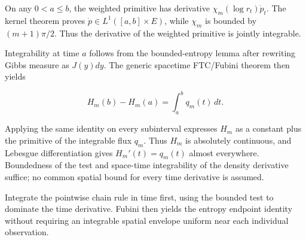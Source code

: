 \documentclass[11pt,a4paper]{report}
\begin{document}
On any \(0<a\le b\), the weighted primitive has derivative \(\chi_m(\log r_t)\dot p_t\). The kernel theorem proves \(\dot p\in L^1([a,b]\times E)\), while \(\chi_m\) is bounded by \((m+1)\pi/2\). Thus the derivative of the weighted primitive is jointly integrable.



Integrability at time \(a\) follows from the bounded-entropy lemma after rewriting Gibbs measure as \(J(y)dy\). The generic spacetime FTC/\allowbreak{}Fubini theorem then yields

\[H_m(b)-H_m(a)=\int_a^b q_m(t)\,dt.\]

Applying the same identity on every subinterval expresses \(H_m\) as a constant plus the primitive of the integrable flux \(q_m\). Thus \(H_m\) is absolutely continuous, and Lebesgue differentiation gives \(H_m'(t)=q_m(t)\) almost everywhere. Boundedness of the test and space-time integrability of the density derivative suffice; no common spatial bound for every time derivative is assumed.



Integrate the pointwise chain rule in time first, using the bounded test to dominate the time derivative. Fubini then yields the entropy endpoint identity without requiring an integrable spatial envelope uniform near each individual observation.
\end{document}
